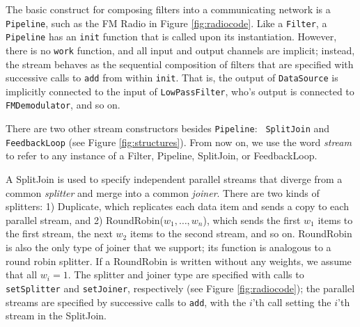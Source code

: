 

The basic construct for composing filters into a communicating network
is a {\tt Pipeline}, such as the FM Radio in Figure
\ref{fig:radiocode}.  Like a {\tt Filter}, a {\tt Pipeline} has an
{\tt init} function that is called upon its instantiation.  However,
there is no {\tt work} function, and all input and output channels are
implicit; instead, the stream behaves as the sequential composition of
filters that are specified with successive calls to {\tt add} from
within {\tt init}.  That is, the output of {\tt DataSource} is
implicitly connected to the input of {\tt LowPassFilter}, who's output
is connected to {\tt FMDemodulator}, and so on.

There are two other stream constructors besides {\tt Pipeline}: {\tt
SplitJoin} and {\tt FeedbackLoop} (see Figure \ref{fig:structures}).
From now on, we use the word {\it stream} to refer to any instance of
a Filter, Pipeline, SplitJoin, or FeedbackLoop.

A SplitJoin is used to specify independent parallel streams that
diverge from a common {\it splitter} and merge into a common {\it
joiner}.  There are two kinds of splitters: 1) Duplicate, which
replicates each data item and sends a copy to each parallel stream,
and 2) RoundRobin($w_1, \dots, w_n$), which sends the first $w_1$
items to the first stream, the next $w_2$ items to the second stream,
and so on.  RoundRobin is also the only type of joiner that we
support; its function is analogous to a round robin splitter.  If a
RoundRobin is written without any weights, we assume that all $w_i =
1$.  The splitter and joiner type are specified with calls to {\tt
setSplitter} and {\tt setJoiner}, respectively (see Figure
\ref{fig:radiocode}); the parallel streams are specified by successive
calls to {\tt add}, with the $i$'th call setting the $i$'th stream in
the SplitJoin.

